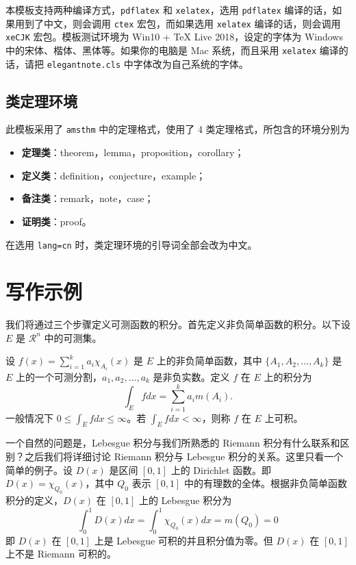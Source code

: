 \documentclass[geye,blue,normal,cn]{elegantnote}
\begin{document}
本模板支持两种编译方式，\lstinline{pdflatex} 和 \lstinline{xelatex}，选用 \lstinline{pdflatex} 编译的话，如果用到了中文，则会调用 \lstinline{ctex} 宏包，而如果选用 \lstinline{xelatex} 编译的话，则会调用 \lstinline{xeCJK} 宏包。模板测试环境为 Win10 + TeX Live 2018，设定的字体为 Windows 中的宋体、楷体、黑体等。如果你的电脑是 Mac 系统，而且采用 \lstinline{xelatex} 编译的话，请把 \lstinline{elegantnote.cls} 中字体改为自己系统的字体。

\subsection{类定理环境}
此模板采用了 \lstinline{amsthm} 中的定理格式，使用了 4 类定理格式，所包含的环境分别为
\begin{itemize}
\item \textbf{定理类}：theorem，lemma，proposition，corollary；
\item \textbf{定义类}：definition，conjecture，example；
\item \textbf{备注类}：remark，note，case；
\item \textbf{证明类}：proof。
\end{itemize}

\begin{remark}
在选用 \lstinline{lang=cn} 时，类定理环境的引导词全部会改为中文。
\end{remark}

\section{写作示例}

我们将通过三个步骤定义可测函数的积分。首先定义非负简单函数的积分。以下设 $E$ 是 $\mathcal{R}^n$ 中的可测集。

\begin{definition}[可积性]
设 $ f(x)=\sum\limits_{i=1}^{k} a_i \chi_{A_i}(x)$ 是 $E$ 上的非负简单函数，其中 $\{A_1,A_2,\ldots,A_k\}$ 是 $E$ 上的一个可测分割，$a_1,a_2,\ldots,a_k$ 是非负实数。定义 $f$ 在 $E$ 上的积分为
\begin{equation}
   \label{inter}
   \int_{E} f dx = \sum_{i=1}^k a_i m(A_i).
\end{equation}
一般情况下 $0 \leq \int_{E} f dx \leq \infty$。若 $\int_{E} f dx < \infty$，则称 $f$ 在 $E$ 上可积。
\end{definition}

一个自然的问题是，Lebesgue 积分与我们所熟悉的 Riemann 积分有什么联系和区别？之后我们将详细讨论 Riemann 积分与 Lebesgue 积分的关系。这里只看一个简单的例子。设 $D(x)$ 是区间 $[0,1]$ 上的 Dirichlet 函数。即 $D(x)=\chi_{Q_0}(x)$，其中 $Q_0$ 表示 $[0,1]$ 中的有理数的全体。根据非负简单函数积分的定义，$D(x)$ 在 $[0,1]$ 上的 Lebesgue 积分为
\begin{equation}
   \label{inter2}
   \int_0^1 D(x)dx = \int_0^1 \chi_{Q_0} (x) dx = m(Q_0) = 0
\end{equation}
即 $D(x)$ 在 $[0,1]$ 上是 Lebesgue 可积的并且积分值为零。但 $D(x)$ 在 $[0,1]$ 上不是 Riemann 可积的。
\end{document}

